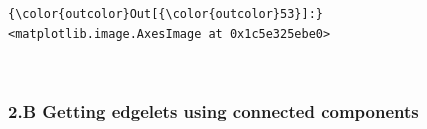 \documentclass[11pt]{article}
\begin{document}
\begin{Verbatim}[commandchars=\\\{\}]
{\color{outcolor}Out[{\color{outcolor}53}]:} <matplotlib.image.AxesImage at 0x1c5e325ebe0>
\end{Verbatim}
            
    \begin{center}
    \end{center}
    { \hspace*{\fill} \\}
    
    \hypertarget{b-getting-edgelets-using-connected-components}{%
\subsubsection{2.B Getting edgelets using connected
components}\label{b-getting-edgelets-using-connected-components}}
\end{document}
